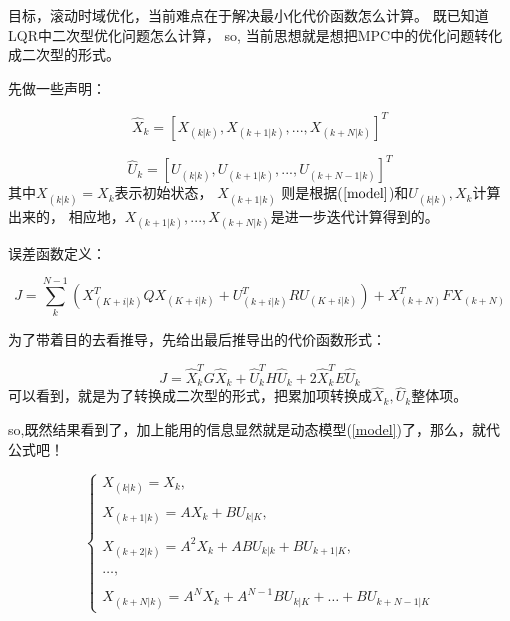 \documentclass[UTF8,a4paper,10pt]{ctexart}
\begin{document}
目标，滚动时域优化，当前难点在于解决最小化代价函数怎么计算。
既已知道LQR中二次型优化问题怎么计算， 
so, 当前思想就是想把MPC中的优化问题转化成二次型的形式。

先做一些声明：

\begin{equation}
    \hat{X}_k = [X_{(k|k)}, X_{(k+1|k)}, ..., X_{(k+N|k)}]^T
\end{equation}

\begin{equation}
    \hat{U}_k = [U_{(k|k)}, U_{(k+1|k)}, ..., U_{(k+N-1|k)}]^T
\end{equation}
其中$X_{(k|k)} = X_k$表示初始状态，
$ X_{(k+1|k)}$ 则是根据($\ref{model}$)和$U_{(k|k)},X_k$计算出来的，
相应地，$X_{(k+1|k)}, ..., X_{(k+N|k)}$是进一步迭代计算得到的。


误差函数定义：

    \begin{equation}\label{MPC_J}
        J = \sum_{k}^{N-1}{(X_{(K+i|k)}^T Q X_{(K+i|k)} + U_{(k+i|k)}^T R U_{(K+i|k)})} + X_{(k+N)}^T F X_{(k+N)}
    \end{equation}

为了带着目的去看推导，先给出最后推导出的代价函数形式：

    \begin{equation}\label{J_AIM}
        J = {\hat{X}_k^T G \hat{X}_k + \hat{U}_k^T H \hat{U}_k} + 2\hat{X}_k^T E \hat{U}_k
    \end{equation}
可以看到，就是为了转换成二次型的形式，把累加项转换成$\hat{X}_k, \hat{U}_k$整体项。

so,既然结果看到了，加上能用的信息显然就是动态模型(\ref{model})了，那么，就代公式吧！
  
    \begin{equation}
        \left\{
            \begin{array}{cc}
                X_{(k|k)} = X_{k},\\ \\
                X_{(k+1|k)} = AX_{k} + BU_{k|K},\\ \\
                X_{(k+2|k)} = A^2X_{k} + ABU_{k|k} + BU_{k+1|K},\\ \\
                \dots,\\ \\ 
                X_{(k+N|k)} = A^NX_{k} + A^{N-1}BU_{k|K} + \dots +  BU_{k+N-1|K}
            \end{array}
        \right.
    \end{equation}
\end{document}
